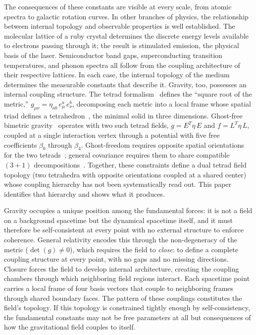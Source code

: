 \documentclass[aps,prd,preprint,superscriptaddress,showpacs,preprintnumbers,amsmath,amssymb,nofootinbib]{revtex4-2}
\begin{document}
The consequences of these constants are visible at every scale, from atomic spectra to galactic rotation curves. In other branches of physics, the relationship between internal topology and observable properties is well established. The molecular lattice of a ruby crystal determines the discrete energy levels available to electrons passing through it; the result is stimulated emission, the physical basis of the laser. Semiconductor band gaps, superconducting transition temperatures, and phonon spectra all follow from the coupling architecture of their respective lattices. In each case, the internal topology of the medium determines the measurable constants that describe it. Gravity, too, possesses an internal coupling structure. The tetrad formalism~\cite{mtw1973,wald1984} defines the ``square root of the metric,'' $g_{\mu\nu} = \eta_{ab}\,e^a_\mu\,e^b_\nu$, decomposing each metric into a local frame whose spatial triad defines a tetrahedron~\cite{barbieri1998}, the minimal solid in three dimensions. Ghost-free bimetric gravity~\cite{hassan2012,hinterbichler2012} operates with two such tetrad fields, $g = E^T\eta\,E$ and $f = L^T\eta\,L$, coupled at a single interaction vertex through a potential with five free coefficients $\beta_0$ through $\beta_4$. Ghost-freedom requires opposite spatial orientations for the two tetrads~\cite{alexander2014}; general covariance requires them to share compatible $(3{+}1)$ decompositions~\cite{hassankocic2018}. Together, these constraints define a dual tetrad field topology (two tetrahedra with opposite orientations coupled at a shared center) whose coupling hierarchy has not been systematically read out. This paper identifies that hierarchy and shows what it produces.

Gravity occupies a unique position among the fundamental forces: it is not a field on a background spacetime but the dynamical spacetime itself, and it must therefore be self-consistent at every point with no external structure to enforce coherence. General relativity encodes this through the non-degeneracy of the metric ($\det(g) \neq 0$), which requires the field to \emph{close}: to define a complete coupling structure at every point, with no gaps and no missing directions. Closure forces the field to develop internal architecture, creating the coupling chambers through which neighboring field regions interact. Each spacetime point carries a local frame of four basis vectors that couple to neighboring frames through shared boundary faces. The pattern of these couplings constitutes the field's topology. If this topology is constrained tightly enough by self-consistency, the fundamental constants may not be free parameters at all but consequences of how the gravitational field couples to itself.
\end{document}
